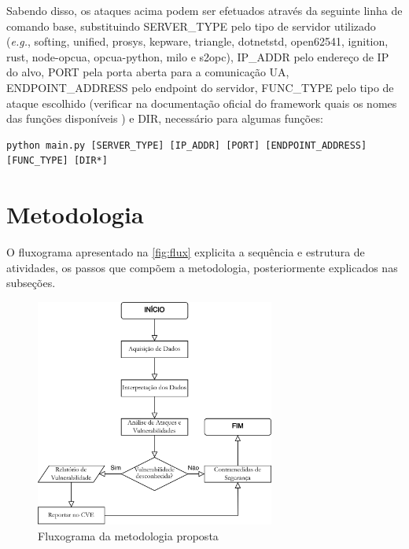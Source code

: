     Sabendo disso, os ataques acima podem ser efetuados através da seguinte linha de comando base, substituindo SERVER\_TYPE pelo tipo de servidor utilizado (\textit{e.g.}, softing, unified, prosys, kepware, triangle, dotnetstd, open62541, ignition, rust, node-opcua, opcua-python, milo e s2opc), IP\_ADDR pelo endereço de IP do alvo, PORT pela porta aberta para a comunicação UA, ENDPOINT\_ADDRESS pelo endpoint do servidor, FUNC\_TYPE pelo tipo de ataque escolhido (verificar na documentação oficial do framework quais os nomes das funções disponíveis \cite{claroty2023}) e DIR, necessário para algumas funções:

    \begin{verbatim}
python main.py [SERVER_TYPE] [IP_ADDR] [PORT] [ENDPOINT_ADDRESS] [FUNC_TYPE] [DIR*]
    \end{verbatim}

\section{Metodologia}

    O fluxograma apresentado na \autoref{fig:flux} explicita a sequência e estrutura de atividades, os passos que compõem a metodologia, posteriormente explicados nas subseções.
    
    \begin{figure}[htbp!]
        \caption{\label{fig:flux}Fluxograma da metodologia proposta}
        \begin{center}
            \includegraphics[width=0.7\textwidth]{USPSC-img/fluxograma.png}
        \end{center}
    \end{figure}

